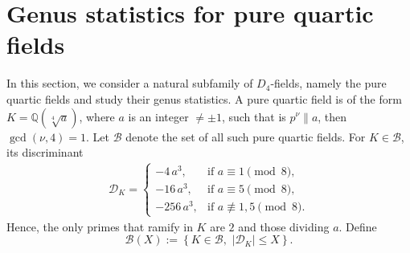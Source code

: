 \documentclass[11pt,reqno]{amsart}
\newcommand{\cB}{\mathcal{B}}
\newcommand{\cD}{\mathcal{D}}
\theoremstyle{definition}
\theoremstyle{remark}
\begin{document}
\section{\bf Genus statistics for pure quartic fields}\label{pure-impure}
\medskip

In this section, we consider a natural subfamily of $D_4$-fields, namely the pure quartic fields and study their genus statistics. A pure quartic field is of the form $K = \mathbb{Q}(\sqrt[4]{a})$, where $a$ is an integer $\neq \pm 1$, such that is $p^{\nu}\| a$, then $\gcd(\nu, 4)=1$. Let $\cB$ denote the set of all such pure quartic fields. For $K\in \cB$, its discriminant
\begin{align}\label{discrimant_pure_fields}
	\cD_K =
	\begin{cases}
		-4\,a^{3}, & \text{if } a \equiv 1 \pmod{8},\\[2mm]
		-16\,a^{3}, & \text{if } a \equiv 5 \pmod{8},\\[2mm]
		-256\,a^{3}, & \text{if } a \not\equiv 1,5 \pmod{8}.
	\end{cases}
\end{align}
Hence, the only primes that ramify in $K$ are $2$ and those dividing $a$. Define 
\begin{equation*}
    \cB(X):= \left\{
K\in \cB,\,\, |\cD_K|\leq X
\right\}.
\end{equation*}
\end{document}
